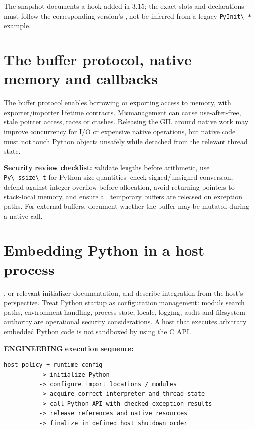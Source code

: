 \documentclass[
  11pt,
]{report}
\newcommand{\passthrough}[1]{#1}
\begin{document}
The snapshot documents a
 hook added in 3.15;
the exact slots and declarations must follow the corresponding version's
, not be
inferred from a legacy \passthrough{\lstinline!PyInit\_*!} example.

\chapter{The buffer protocol, native memory and
callbacks}\label{the-buffer-protocol-native-memory-and-callbacks}

The buffer protocol enables borrowing or exporting access to memory,
with exporter/importer lifetime contracts. Mismanagement can cause
use-after-free, stale pointer access, races or crashes. Releasing the
GIL around native work may improve concurrency for I/O or expensive
native operations, but native code must not touch Python objects
unsafely while detached from the relevant thread state.

\textbf{Security review checklist:} validate lengths before arithmetic,
use \passthrough{\lstinline!Py\_ssize\_t!} for Python-size quantities,
check signed/unsigned conversion, defend against integer overflow before
allocation, avoid returning pointers to stack-local memory, and ensure
all temporary buffers are released on exception paths. For external
buffers, document whether the buffer may be mutated during a native
call.

\chapter{Embedding Python in a host
process}\label{embedding-python-in-a-host-process}

,
 or relevant
initializer documentation, and
 describe
integration from the host's perspective. Treat Python startup as
configuration management: module search paths, environment handling,
process state, locale, logging, audit and filesystem authority are
operational security considerations. A host that executes arbitrary
embedded Python code is not sandboxed by using the C API.

\textbf{ENGINEERING execution sequence:}

\begin{lstlisting}
host policy + runtime config
          -> initialize Python
          -> configure import locations / modules
          -> acquire correct interpreter and thread state
          -> call Python API with checked exception results
          -> release references and native resources
          -> finalize in defined host shutdown order
\end{lstlisting}
\end{document}
